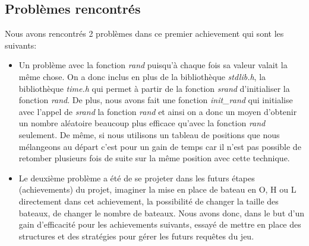 \subsection{Problèmes rencontrés}
Nous avons rencontrés 2 problèmes dans ce premier achievement qui sont les suivants:\\
\begin{itemize}
\item Un problème avec la fonction \textit{rand} puisqu'à chaque fois sa valeur valait la même chose. On a donc inclus en plus de la bibliothèque \textit{stdlib.h}, la bibliothèque \textit{time.h} qui permet à partir de la fonction \textit{srand} d'initialiser la fonction \textit{rand}. De plus, nous avons fait une fonction \textit{init\_rand} qui initialise avec l'appel de \textit{srand} la fonction \textit{rand} et ainsi on a donc un moyen d'obtenir un nombre aléatoire beaucoup plus efficace qu'avec la fonction \textit{rand} seulement. De même, si nous utilisons un tableau de positions que nous mélangeons au départ c'est pour un gain de temps car il n'est pas possible de retomber plusieurs fois de suite sur la même position avec cette technique.\\

\item Le deuxième problème a été de se projeter dans les futurs étapes (achievements) du projet, imaginer la mise en place de bateau en O, H ou L directement dans cet achievement, la possibilité de changer la taille des bateaux, de changer le nombre de bateaux. Nous avons donc, dans le but d'un gain d'efficacité pour les achievements suivants, essayé de mettre en place des structures et des stratégies pour gérer les futurs requêtes du jeu. 
\end{itemize}


